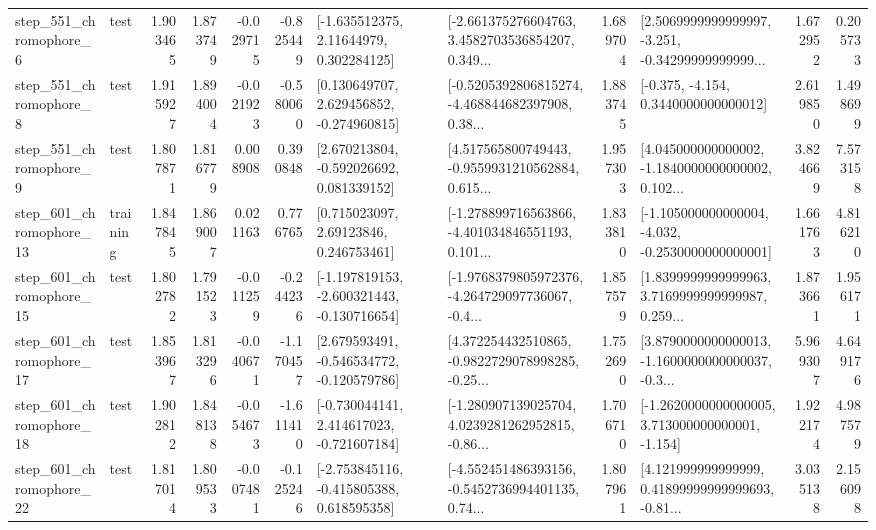 \begin{tabular}{llrrrrllrlrr}
   step\_551\_chromophore\_6 &      test &      1.903465 &    1.873749 &     -0.029715 & -0.825449 &     [-1.635512375, 2.11644979, 0.302284125] &  [-2.661375276604763, 3.4582703536854207, 0.349... &       1.689704 &  [2.5069999999999997, -3.251, -0.34299999999999... &            1.672952 &          0.205733 \\
   step\_551\_chromophore\_8 &      test &      1.915927 &    1.894004 &     -0.021923 & -0.580060 &    [0.130649707, 2.629456852, -0.274960815] &  [-0.5205392806815274, -4.468844682397908, 0.38... &       1.883745 &               [-0.375, -4.154, 0.3440000000000012] &            2.619850 &          1.498699 \\
   step\_551\_chromophore\_9 &      test &      1.807871 &    1.816779 &      0.008908 &  0.390848 &    [2.670213804, -0.592026692, 0.081339152] &  [4.517565800749443, -0.9559931210562884, 0.615... &       1.957303 &  [4.045000000000002, -1.1840000000000002, 0.102... &            3.824669 &          7.573158 \\
  step\_601\_chromophore\_13 &  training &      1.847845 &    1.869007 &      0.021163 &  0.776765 &      [0.715023097, 2.69123846, 0.246753461] &  [-1.278899716563866, -4.401034846551193, 0.101... &       1.833810 &  [-1.105000000000004, -4.032, -0.2530000000000001] &            1.661763 &          4.816210 \\
  step\_601\_chromophore\_15 &      test &      1.802782 &    1.791523 &     -0.011259 & -0.244236 &  [-1.197819153, -2.600321443, -0.130716654] &  [-1.9768379805972376, -4.264729097736067, -0.4... &       1.857579 &  [1.8399999999999963, 3.7169999999999987, 0.259... &            1.873661 &          1.956171 \\
  step\_601\_chromophore\_17 &      test &      1.853967 &    1.813296 &     -0.040671 & -1.170457 &   [2.679593491, -0.546534772, -0.120579786] &  [4.372254432510865, -0.9822729078998285, -0.25... &       1.752690 &  [3.8790000000000013, -1.1600000000000037, -0.3... &            5.969307 &          4.649176 \\
  step\_601\_chromophore\_18 &      test &      1.902812 &    1.848138 &     -0.054673 & -1.611410 &   [-0.730044141, 2.414617023, -0.721607184] &  [-1.280907139025704, 4.0239281262952815, -0.86... &       1.706710 &   [-1.2620000000000005, 3.713000000000001, -1.154] &            1.922174 &          4.987579 \\
  step\_601\_chromophore\_22 &      test &      1.817014 &    1.809533 &     -0.007481 & -0.125246 &   [-2.753845116, -0.415805388, 0.618595358] &  [-4.552451486393156, -0.5452736994401135, 0.74... &       1.807961 &  [4.121999999999999, 0.41899999999999693, -0.81... &            3.035138 &          2.156098 \\

\end{tabular}
